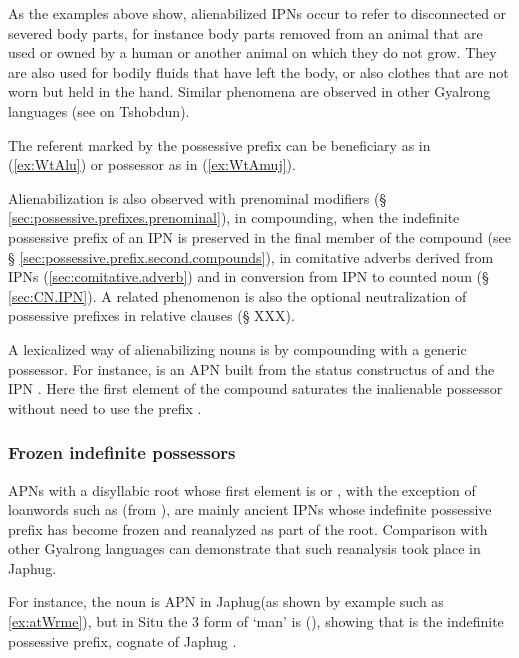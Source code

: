 As the examples above show, alienabilized IPNs occur to refer to disconnected or severed body parts, for instance body parts removed from an animal that are used or owned by a human or another animal on which they do not grow. They are also used for bodily fluids that have left the body, or also clothes that are not worn but held in the hand. Similar phenomena are observed in other Gyalrong languages (see \citealt[140]{jackson98morphology} on Tshobdun).

The referent marked by the possessive prefix can be beneficiary as in (\ref{ex:WtAlu}) or possessor as in (\ref{ex:WtAmuj}).
 
Alienabilization is also observed with prenominal modifiers (§ \ref{sec:possessive.prefixes.prenominal}), in compounding, when the indefinite possessive prefix of an IPN is preserved in the final member of the compound (see § \ref{sec:possessive.prefix.second.compounds}), in comitative adverbs derived from IPNs (\ref{sec:comitative.adverb}) and in conversion from IPN to counted noun (§ \ref{sec:CN.IPN}). A related phenomenon is also the optional neutralization of possessive prefixes in relative clauses (§ XXX).
 
A lexicalized way of alienabilizing nouns is by compounding with a generic possessor. For instance,  is an APN built from the status constructus of  and the IPN . Here the first element of the compound  saturates the inalienable possessor without need to use the prefix .

\subsubsection{Frozen indefinite possessors} \label{sec:frozen.indef}
APNs with a disyllabic root whose first element is  or , with the exception of loanwords such as  (from ), are mainly ancient IPNs whose indefinite possessive prefix  has become frozen and reanalyzed as part of the root. Comparison with other Gyalrong languages can demonstrate that such reanalysis took place in Japhug.

For instance, the noun  is APN in Japhug(as shown by example such as \ref{ex:atWrme}), but in Situ the 3\sg{} form of  `man' is   (\citealt[183;197]{lin09phd}), showing that  is the indefinite possessive prefix, cognate of Japhug . 

